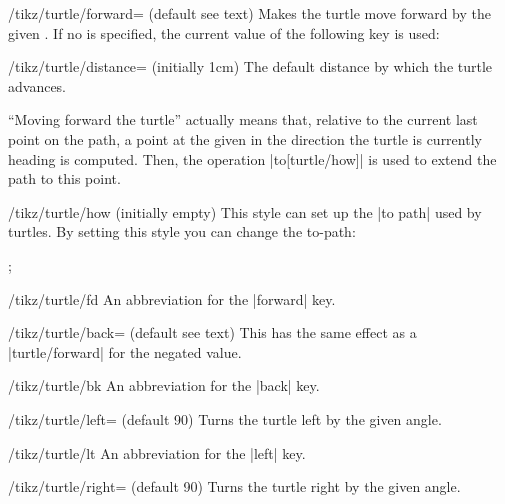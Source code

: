 \begin{key}{/tikz/turtle/forward= (default \normalfont see text)}
  Makes the turtle move forward by the given . If no
   is specified, the current value of the following key
  is used:
  \begin{key}{/tikz/turtle/distance= (initially 1cm)}
    The default distance by which the turtle advances.
  \end{key}
  ``Moving forward the turtle'' actually means that, relative to the
  current last point on the path, a point at the given 
  in the direction the turtle is currently heading is computed. Then,
  the operation |to[turtle/how]| is used to extend the path to this
  point. 
  \begin{stylekey}{/tikz/turtle/how (initially \normalfont empty)}
    This style can set up the |to path| used by turtles. By setting
    this style you can change the to-path: 
\begin{codeexample}[]
\tikz \draw [turtle={how/.style={bend left},home,forward,right,forward}];
\end{codeexample}    
  \end{stylekey}
\end{key}

\begin{key}{/tikz/turtle/fd}
  An abbreviation for the |forward| key.
\end{key}

\begin{key}{/tikz/turtle/back= (default \normalfont see text)}
  This has the same effect as a |turtle/forward| for the negated
   value.
\end{key}

\begin{key}{/tikz/turtle/bk}
  An abbreviation for the |back| key.
\end{key}

\begin{key}{/tikz/turtle/left= (default 90)}
  Turns the turtle left by the given angle. 
\end{key}

\begin{key}{/tikz/turtle/lt}
  An abbreviation for the |left| key.
\end{key}

\begin{key}{/tikz/turtle/right= (default 90)}
  Turns the turtle right by the given angle. 
\end{key}

